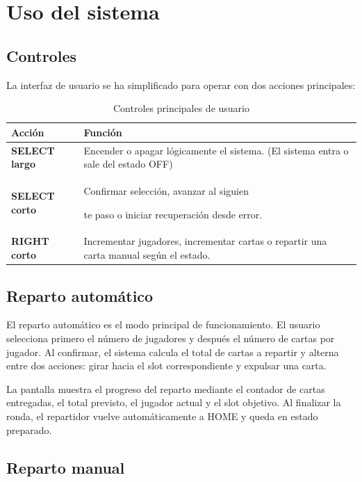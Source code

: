 \documentclass[a4paper, 11pt]{article}
\begin{document}
\section{Uso del sistema}

\subsection{Controles}

La interfaz de usuario se ha simplificado para operar con dos acciones principales:

\begin{table}[H]
\centering
\small
\begin{tabularx}{\textwidth}{>{\bfseries}p{}X}
\hline
\textbf{Acción} & \textbf{Función} \\
\hline
SELECT largo & Encender o apagar lógicamente el sistema. (El sistema entra o sale del estado OFF) \\
SELECT corto & Confirmar selección, avanzar al siguien

te paso o iniciar recuperación desde error. \\
RIGHT corto & Incrementar jugadores, incrementar cartas o repartir una carta manual según el estado. \\
\hline
\end{tabularx}
\caption{Controles principales de usuario}
\label{tab:manual_controles}
\end{table}

\subsection{Reparto automático}

El reparto automático es el modo principal de funcionamiento. El usuario selecciona primero el número de jugadores y después el número de cartas por jugador. Al confirmar, el sistema calcula el total de cartas a repartir y alterna entre dos acciones: girar hacia el slot correspondiente y expulsar una carta.

La pantalla muestra el progreso del reparto mediante el contador de cartas entregadas, el total previsto, el jugador actual y el slot objetivo. Al finalizar la ronda, el repartidor vuelve automáticamente a HOME y queda en estado preparado.

\subsection{Reparto manual}
\end{document}
